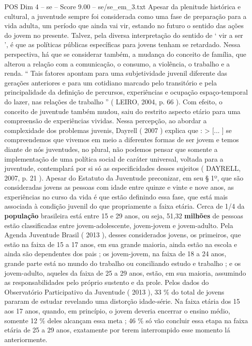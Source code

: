 \begin{textsample}{POS Dim 4 – se – Score 9.00 – se/se\_em\_3.txt}
Apesar da plenitude histórica e cultural, a juventude sempre foi considerada como uma fase de preparação para a vida adulta, um período que ainda vai vir, estando no futuro o sentido das ações do jovem no presente.
Talvez, pela diversa interpretação do sentido de ‘ vir a ser ’, é que as políticas públicas específicas para jovens tenham se retardado.
Nessa perspectiva, há que se considerar também, a mudança do conceito de família, que alterou a relação com a comunicação, o consumo, a violência, o trabalho e a renda. “ Tais fatores apontam para uma subjetividade juvenil diferente das gerações anteriores e para um cotidiano marcado pelo transitório e pela principalidade da definição de percursos, experiências e ocupação espaço-temporal do lazer, nas relações de trabalho ” ( LEIRO, 2004, p. 66 ).
Com efeito, o conceito de juventude também mudou, saiu do restrito aspecto etário para uma compreensão de experiências vividas.
Nessa percepção, ao abordar a complexidade dos problemas juvenis, Dayrell ( 2007 ) explica que : > [... ] se compreendemos que vivemos em meio a diferentes formas de ser jovem e temos diante de nós juventudes, no plural, não podemos pensar que somente a implementação de uma política social de caráter universal, voltada para a juventude, contemplará por si só as especificidades desses sujeitos ( DAYRELL, 2007, p. 21 ).
Apesar do Estatuto da Juventude preconizar, em seu § 1º, que são consideradas jovens as pessoas com idade entre quinze e vinte e nove anos, as experiências no curso da vida é que estão definindo essa fase, que está mais associada à condição juvenil do que propriamente a faixa etária.
Cerca de 1/4 da \textbf{população} brasileira está entre 15 e 29 anos, ou seja, 51,32 \textbf{milhões} de pessoas estão classificadas entre jovem-adolescente, jovem-jovem e jovem-adulto.
Pela Agenda Juventude Brasil ( 2013 ), desses considerados jovens, os primeiros, que estão na faixa de 15 a 17 anos, em sua grande maioria, ainda estão na escola e ainda são dependentes dos pais ; os jovem-jovem, na faixa de 18 a 24 anos, grande parte está no mundo do trabalho ou conciliando estudo e trabalho ; e os jovem-adulto, aqueles da faixa de 25 a 29 anos, estão, em sua maioria, assumindo as responsabilidades pelo próprio sustento e da prole.
Pelos dados do Observatório Participativo da Juventude ( 2013 ), 33 \% do total de jovens pararam de estudar revelando uma distorção idade-série.
Na faixa etária dos 15 aos 17 anos, quando, em princípio, o jovem deveria encerrar o ensino médio, somente 12 \% deles alcançam essa meta ; 46 \% só vão concluir essa etapa na faixa etária de 25 a 29 anos, exatamente por terem interrompido esse momento lá anteriormente.

\end{textsample}
